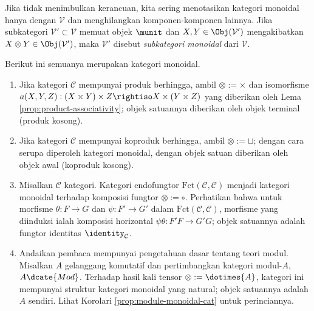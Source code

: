 Jika tidak menimbulkan kerancuan, kita sering menotasikan kategori monoidal hanya dengan $\mathcal{V}$ dan menghilangkan komponen-komponen lainnya. Jika subkategori $\mathcal{V}' \subset \mathcal{V}$ memuat objek $\munit$ dan $X,Y \in \Obj(\mathcal{V}')$ mengakibatkan $X \otimes Y \in \Obj(\mathcal{V}')$, maka $\mathcal{V}'$ disebut \emph{subkategori monoidal} dari $\mathcal{V}$. 

\begin{example}\label{eg:monoidal-cat}
	Berikut ini semuanya merupakan kategori monoidal.
	\begin{enumerate}
		\item Jika kategori $\mathcal{C}$ mempunyai produk berhingga, ambil $\otimes := \times$ dan isomorfisme $a(X,Y,Z): (X \times Y) \times Z \rightiso X \times (Y \times Z)$ yang diberikan oleh Lema \ref{prop:product-associativity}; objek satuannya diberikan oleh objek terminal (produk kosong).
		\item Jika kategori $\mathcal{C}$ mempunyai koproduk berhingga, ambil $\otimes := \sqcup$; dengan cara serupa diperoleh kategori monoidal, dengan objek satuan diberikan oleh objek awal (koproduk kosong).
		\item Misalkan $\mathcal{C}$ kategori. Kategori endofungtor $\text{Fct}(\mathcal{C}, \mathcal{C})$ menjadi kategori monoidal terhadap komposisi fungtor $\otimes := \circ$. Perhatikan bahwa untuk morfisme $\theta: F \to G$ dan $\psi: F' \to G'$ dalam $\text{Fct}(\mathcal{C}, \mathcal{C})$, morfisme yang diinduksi ialah komposisi horizontal $\psi\theta: F'F \to G'G$; objek satuannya adalah fungtor identitas $\identity_{\mathcal{C}}$.
		\item Andaikan pembaca mempunyai pengetahuan dasar tentang teori modul. Misalkan $A$ gelanggang komutatif dan pertimbangkan kategori modul-$A$, $A\dcate{Mod}$. Terhadap hasil kali tensor $\otimes := \dotimes{A}$, kategori ini mempunyai struktur kategori monoidal yang natural; objek satuannya adalah $A$ sendiri. Lihat Korolari \ref{prop:module-monoidal-cat} untuk perinciannya.
	\end{enumerate}
\end{example}

